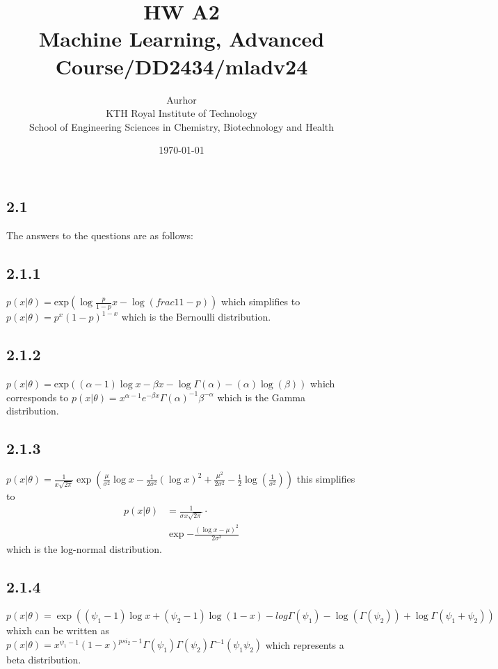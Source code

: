 \documentclass{article}
\title{HW A2\\\Large{Machine Learning, Advanced Course/DD2434/mladv24}}
\author{Aurhor \\ KTH Royal Institute of Technology\\ School of Engineering Sciences in Chemistry, Biotechnology and Health}
\date{\today}
\begin{document}
\maketitle

\fancyfoot[C]{\thepage}
\begin{multicols}{2}

    \section*{2.1}
    The answers to the questions are as follows:

    \subsection*{2.1.1}
    $p(x|\theta) = \text{exp}(\log \frac{p}{1-p} x -\log(frac{1}{1-p}))$ which simplifies to $p(x|\theta) =p^x(1-p)^{1-x}$
    which is the Bernoulli distribution.

    \subsection*{2.1.2}
    $p(x|\theta) = \text{exp}((\alpha-1)\log x - \beta x - \log \Gamma (\alpha)-(\alpha)\log(\beta))$ which corresponds to
    $p(x|\theta) = x^{\alpha-1} e^{-\beta x} \Gamma(\alpha)^{-1}\beta^{-\alpha}$  which is the Gamma distribution.

    \subsection*{2.1.3}
    $p(x|\theta) = \frac{1}{x \sqrt{2\pi}} \exp (\frac{\mu}{\sigma^2} \log x - \frac{1}{2\sigma^2} (\log x)^2 + \frac{\mu^2}{2 \sigma^2} - \frac{1}{2} \log (\frac{1}{\sigma^2})) $ this simplifies to
    \begin{equation*}
        \begin{aligned}
            p(x|\theta) &= \frac{1}{\sigma x \sqrt{2\pi}} \cdot \\
            &\exp {-\frac{(\log x - \mu)^2}{2 \sigma^2}}
        \end{aligned}    
    \end{equation*}
    which is the log-normal distribution.

    \subsection*{2.1.4}
    $p(x|\theta) = \exp( (\psi_1 - 1) \log x + (\psi_2-1)\log(1-x) - log\Gamma(\psi_1)-\log(\Gamma(\psi_2))+\log \Gamma(\psi_1+\psi_2))$
    whixh can be written as $p(x|\theta) = x^{\psi_1-1}(1-x)^{psi_2-1} \Gamma(\psi_1)\Gamma(\psi_2)\Gamma^{-1}(\psi_1\psi_2)$ which
    represents a beta distribution.

\end{multicols}
\end{document}
